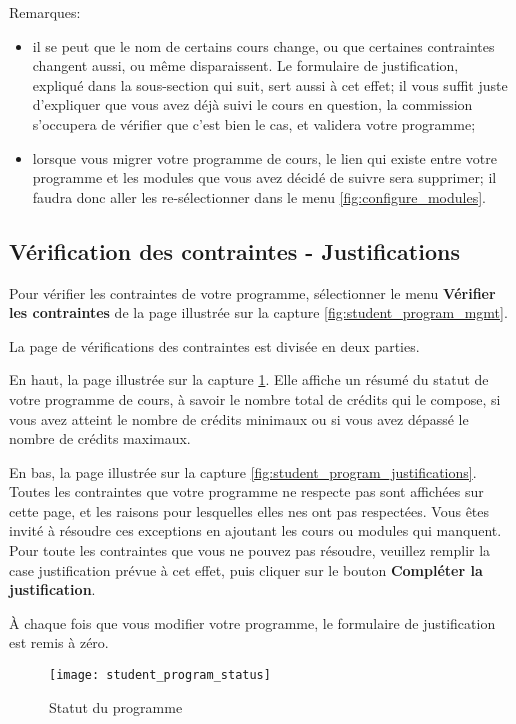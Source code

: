 Remarques:
\begin{itemize}
\item il se peut que le nom de certains cours change, ou que certaines contraintes changent aussi, ou même disparaissent. Le formulaire de justification, expliqué dans la sous-section qui suit, sert aussi à cet effet; il vous suffit juste d'expliquer que vous avez déjà suivi le cours en question, la commission s'occupera de vérifier que c'est bien le cas, et validera votre programme;
\item lorsque vous migrer votre programme de cours, le lien qui existe entre votre programme et les modules que vous avez décidé de suivre sera supprimer; il faudra donc aller les re-sélectionner dans le menu \ref{fig:configure_modules}. 
\end{itemize} 
\subsection{Vérification des contraintes - Justifications}

Pour vérifier les contraintes de votre programme, sélectionner le menu \textbf{Vérifier les contraintes} de la page illustrée sur la capture \ref{fig:student_program_mgmt}. 

La page de vérifications des contraintes est divisée en deux parties. 

En haut, la page illustrée sur la capture \ref{fig:student_program_status}. Elle affiche un résumé du statut de votre programme de cours, à savoir le nombre total de crédits qui le compose, si vous avez atteint le nombre de crédits minimaux ou si vous avez dépassé le nombre de crédits maximaux. 

En bas, la page illustrée sur la capture \ref{fig:student_program_justifications}. Toutes les contraintes que votre programme ne respecte pas sont affichées sur cette page, et les raisons pour lesquelles elles nes ont pas respectées. Vous êtes invité à résoudre ces exceptions en ajoutant les cours ou modules qui manquent. Pour toute les contraintes que vous ne pouvez pas résoudre, veuillez remplir la case justification prévue à cet effet, puis cliquer sur le bouton \textbf{Compléter la justification}.

À chaque fois que vous modifier votre programme, le formulaire de justification est remis à zéro. 

\begin{figure}[htb]
\centering
\caption{Statut du programme}
\label{fig:student_program_status}
\texttt{[image: student\_program\_status]}
\end{figure}

